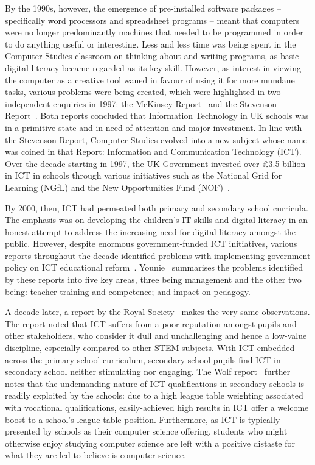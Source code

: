 \documentclass{sig-alternate}
\begin{document}
By the 1990s, however, the emergence of pre-installed software
packages -- specifically word processors and spreadsheet programs --
meant that computers were no longer predominantly machines that needed
to be programmed in order to do anything useful or interesting.  Less
and less time was being spent in the Computer Studies classroom on
thinking about and writing programs, as basic digital literacy became
regarded as its key skill.  However, as interest in viewing the
computer as a creative tool waned in favour of using it for more
mundane tasks, various problems were being created, which were
highlighted in two independent enquiries in 1997: the McKinsey
Report~\cite{McKinsey:1997} and the Stevenson
Report~\cite{Stevenson:1997}.  Both reports concluded that Information
Technology in UK schools was in a primitive state and in need of
attention and major investment.  In line with the Stevenson
Report, Computer Studies evolved into a new
subject whose name was coined in that Report: Information and
Communication Technology (ICT).  Over the decade starting in 1997, the
UK Government invested over \pounds3.5 billion in ICT in schools
through various initiatives such as the National Grid for Learning
(NGfL) and the New Opportunities Fund (NOF)~\cite{Doughty:2006}.

By 2000, then, ICT had permeated both primary and secondary school
curricula.  The emphasis was on developing the children's IT skills
and digital literacy in an honest attempt to address the increasing
need for digital literacy amongst the public.  However, despite
enormous government-funded ICT initiatives, various reports throughout
the decade identified problems with implementing government policy on
ICT educational
reform~\cite{OpieFukuyo:2000,Ofsted:2001,Ofsted:2002,Ofsted:2004,
Loveless:2005}.  Younie~\cite{Younie:2006} summarises the problems
identified by these reports into five key areas, three being
management and the other two being: teacher training and competence;
and impact on pedagogy.

A decade later, a report by the Royal Society~\cite{RoyalSoc:2012}
makes the very same observations.  The report noted that ICT suffers
from a poor reputation amongst pupils and other stakeholders, who
consider it dull and unchallenging and hence a low-value discipline,
especially compared to other STEM subjects.  With ICT embedded across
the primary school curriculum, secondary school pupils find ICT
in secondary school neither stimulating nor engaging.  The Wolf
report~\cite{Wolf:2011} further notes that the undemanding nature of
ICT qualifications in secondary schools is readily exploited by the
schools: due to a high league table weighting associated with
vocational qualifications, easily-achieved high results in ICT offer a
welcome boost to a school's league table position.  Furthermore, as
ICT is typically presented by schools as their computer science
offering, students who might otherwise enjoy studying computer science
are left with a positive distaste for what they are led to believe is
computer science.
\end{document}
